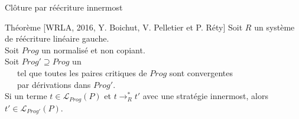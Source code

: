 \begin{frame}{Clôture par réécriture innermost}
  \begin{alertblock}{Théorème [WRLA, 2016, Y. Boichut, V. Pelletier et P. Réty]}
    Soit $R$ un système de réécriture linéaire gauche.\\
    \pause
    Soit $Prog$ un \csprogramme normalisé et non copiant.\\
    \pause
    Soit $Prog' \supseteq Prog$ un \csprogramme \\
    \pause
    ~~~tel que toutes les paires critiques de $Prog$ sont convergentes\\
    ~~~par dérivations \snc dans $Prog'$.\\
    \pause
    Si un terme $t \in \mathcal{L}_{Prog}(P)$ et $t \rightarrow^*_R t'$ avec une stratégie innermost, alors $t' \in \mathcal L_{Prog'}(P)$.
  \end{alertblock}
\end{frame}
